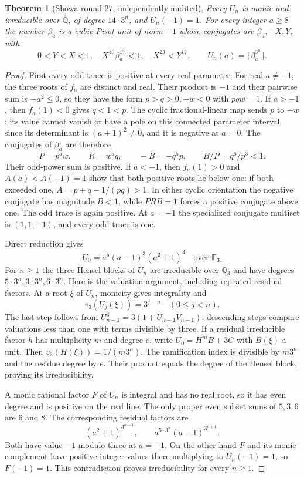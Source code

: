 \documentclass[11pt,a4paper]{article}
\newtheorem{theorem}{Theorem}[section]
\theoremstyle{definition}\newtheorem{definition}[theorem]{Definition}
\theoremstyle{remark}\newtheorem{remark}[theorem]{Remark}
\begin{document}
\begin{theorem}[Showa round 27, independently audited]
\label{pis:fac:uniform}
Every $U_n$ is monic and irreducible over $\mathbb Q$, of degree
$14\cdot3^n$, and $U_n(-1)=1$. For every integer $a\ge8$ the number
$\beta_a$ is a cubic Pisot unit of norm $-1$ whose conjugates are
$\beta_a,-X,Y$, with
\[
 0<Y<X<1,\quad X^{40}\beta_a^{17}<1,
 \quad X^{23}<Y^{17},\qquad
 U_n(a)=\lfloor\beta_a^{3^n}\rfloor.
\]
\end{theorem}
\begin{proof}
First every odd trace is positive at every real parameter. For real
$a\ne-1$, the three roots of $f_a$ are distinct and real. Their product
is $-1$ and their pairwise sum is $-a^2\le0$, so they have the form
$p>q>0,-w<0$ with $pqw=1$. If $a>-1$, then $f_a(1)<0$ gives
$q<1<p$. The cyclic fractional-linear map sends $p$ to $-w$:
its value cannot vanish or have a pole on this connected parameter
interval, since its determinant is $(a+1)^2\ne0$, and it is negative
at $a=0$. The conjugates of $\beta_a$ are therefore
\[
 P=p^5w,\qquad R=w^5q,\qquad -B=-q^5p,
 \qquad B/P=q^6/p^3<1.
\]
Their odd-power sum is positive. If $a<-1$, then $f_a(1)>0$ and
$A(a)<A(-1)=1$ show that both positive roots lie below one: if both
exceeded one, $A=p+q-1/(pq)>1$. In either cyclic orientation the
negative conjugate has magnitude $B<1$, while $PRB=1$ forces a positive
conjugate above one. The odd trace is again positive. At $a=-1$ the
specialized conjugate multiset is $(1,1,-1)$, and every odd trace is one.

Direct reduction gives
\begin{equation}\label{pis:fac:res}
 \overline U_0=a^5(a-1)^3(a^2+1)^3\quad\text{over }\mathbb F_3.
\end{equation}
For $n\ge1$ the three Hensel blocks of $U_n$ are irreducible over
$\mathbb Q_3$ and have degrees $5\cdot3^n,3\cdot3^n,6\cdot3^n$.
Here is the valuation argument, including repeated residual factors.
At a root $\xi$ of $U_n$, monicity gives integrality and
\[
 v_3(U_j(\xi))=3^{j-n}\quad(0\le j<n).
\]
The last step follows from $U_{n-1}^3=3(1+U_{n-1}V_{n-1})$;
descending steps compare valuations less than one with terms divisible
by three. If a residual irreducible factor $h$ has multiplicity $m$
and degree $e$, write $U_0=H^m B+3C$ with $B(\xi)$ a unit.
Then $v_3(H(\xi))=1/(m3^n)$. The ramification index is divisible by
$m3^n$ and the residue degree by $e$. Their product equals the degree
of the Hensel block, proving its irreducibility.

A monic rational factor $F$ of $U_n$ is integral and has no real root,
so it has even degree and is positive on the real line. The only proper
even subset sums of $5,3,6$ are $6$ and $8$. The corresponding residual
factors are
\[
 (a^2+1)^{3^{n+1}},\qquad
 a^{5\cdot3^n}(a-1)^{3^{n+1}}.
\]
Both have value $-1$ modulo three at $a=-1$. On the other hand $F$ and
its monic complement have positive integer values there multiplying
to $U_n(-1)=1$, so $F(-1)=1$. This contradiction proves irreducibility
for every $n\ge1$.


\end{proof}
\end{document}

